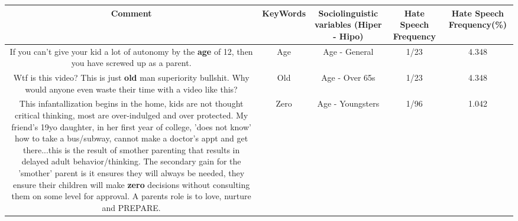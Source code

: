 \documentclass[11pt]{article}
\newlength\mylength
\begin{document}
\begin{center}
\setlength\mylength{\dimexpr\textwidth - 1\arrayrulewidth - 50\tabcolsep}
\begin{longtable}{|C{.65\mylength}|C{.30\mylength}|C{.12\mylength}|C{.12\mylength}|C{.12\mylength}|}
\hline
\textbf{Comment} & \textbf{KeyWords} & \textbf{Sociolinguistic variables (Hiper - Hipo)}  & \textbf{Hate Speech Frequency} & \textbf{Hate Speech Frequency(\%)} \\
\hline{}\small If you can't give your kid a lot of autonomy by the \textbf{age} of 12, then you have screwed up as a parent.\normalsize   & Age & Age - General & 1/23 & 4.348 \\  \hline
  \small Wtf is this video? This is just \textbf{old} man superiority bullshit. Why would anyone even waste their time with a video like this?\normalsize   & Old & Age - Over 65s & 1/23 & 4.348 \\  \hline
  \small This infantallization begins in the home, kids are not thought critical thinking, most are over-indulged and over protected. My friend's 19yo daughter, in her first year of college, 'does not know' how to take a bus/subway, cannot make a doctor's appt and get there...this is the result of smother parenting that results in delayed adult behavior/thinking. The secondary gain for the 'smother' parent is it ensures they will always be needed,  they ensure their children will make \textbf{zero} decisions without consulting them on some level for approval. A parents role is to love, nurture and PREPARE.\normalsize   & Zero & Age - Youngsters & 1/96 & 1.042 \\  \hline

\end{longtable}
\end{center}
\end{document}
